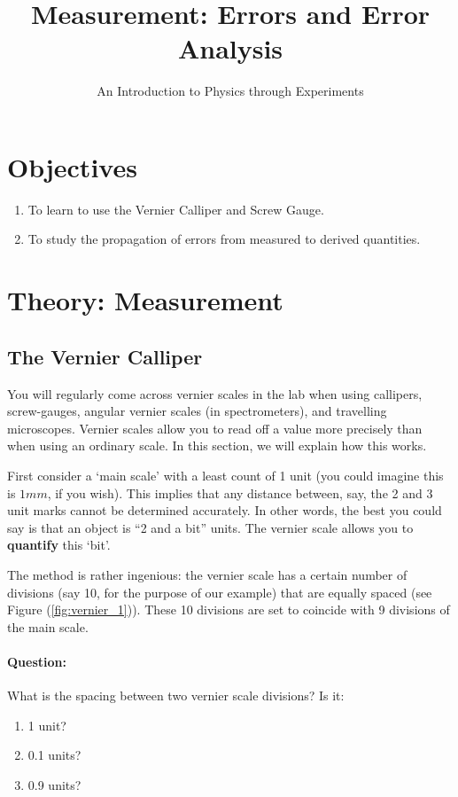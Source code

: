 \title{Measurement: Errors and Error Analysis}
\author{An Introduction to Physics through Experiments}
\date{}

\maketitle

\section{Objectives}

\begin{enumerate}
    \item To learn to use the Vernier Calliper and Screw Gauge.
    \item To study the propagation of errors from measured to derived quantities.
\end{enumerate}


\section{Theory: Measurement}

\subsection{The Vernier Calliper}

You will regularly come across vernier scales in the lab when using callipers, screw-gauges, angular vernier scales (in spectrometers), and travelling microscopes. Vernier scales allow you to read off a value more precisely than when using an ordinary scale. In this section, we will explain how this works.

First consider a `main scale' with a least count of 1 unit (you could imagine this is $1mm$, if you wish). This implies that any distance between, say, the 2 and 3 unit marks cannot be determined accurately. In other words, the best you could say is that an object is ``2 and a bit'' units. The vernier scale allows you to \textbf{quantify} this `bit'.  

The method is rather ingenious: the vernier scale has a certain number of divisions (say 10, for the purpose of our example) that are equally spaced (see Figure (\ref{fig:vernier_1})). These 10 divisions are set to coincide with 9 divisions of the main scale.

\begin{question}
    \paragraph{Question:} What is the spacing between two vernier scale divisions? Is it:
    \begin{enumerate}
        \item 1 unit?
        \item 0.1 units?
        \item 0.9 units?
    \end{enumerate}
\end{question}



